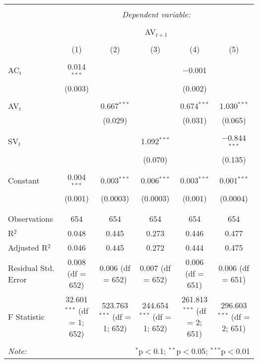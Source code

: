 
\begin{table}[!htbp] \centering 
  \caption{} 
  \label{} 
\begin{tabular}{@{\extracolsep{5pt}}lccccc} 
\\[-1.8ex]\hline 
\hline \\[-1.8ex] 
 & \multicolumn{5}{c}{\textit{Dependent variable:}} \\ 
\cline{2-6} 
\\[-1.8ex] & \multicolumn{5}{c}{AV$_{t+1}$} \\ 
\\[-1.8ex] & (1) & (2) & (3) & (4) & (5)\\ 
\hline \\[-1.8ex] 
 AC$_{t}$ & 0.014$^{***}$ &  &  & $-$0.001 &  \\ 
  & (0.003) &  &  & (0.002) &  \\ 
  & & & & & \\ 
 AV$_{t}$ &  & 0.667$^{***}$ &  & 0.674$^{***}$ & 1.030$^{***}$ \\ 
  &  & (0.029) &  & (0.031) & (0.065) \\ 
  & & & & & \\ 
 SV$_{t}$ &  &  & 1.092$^{***}$ &  & $-$0.844$^{***}$ \\ 
  &  &  & (0.070) &  & (0.135) \\ 
  & & & & & \\ 
 Constant & 0.004$^{***}$ & 0.003$^{***}$ & 0.006$^{***}$ & 0.003$^{***}$ & 0.001$^{***}$ \\ 
  & (0.001) & (0.0003) & (0.0003) & (0.001) & (0.0004) \\ 
  & & & & & \\ 
\hline \\[-1.8ex] 
Observations & 654 & 654 & 654 & 654 & 654 \\ 
R$^{2}$ & 0.048 & 0.445 & 0.273 & 0.446 & 0.477 \\ 
Adjusted R$^{2}$ & 0.046 & 0.445 & 0.272 & 0.444 & 0.475 \\ 
Residual Std. Error & 0.008 (df = 652) & 0.006 (df = 652) & 0.007 (df = 652) & 0.006 (df = 651) & 0.006 (df = 651) \\ 
F Statistic & 32.601$^{***}$ (df = 1; 652) & 523.763$^{***}$ (df = 1; 652) & 244.654$^{***}$ (df = 1; 652) & 261.813$^{***}$ (df = 2; 651) & 296.603$^{***}$ (df = 2; 651) \\ 
\hline 
\hline \\[-1.8ex] 
\textit{Note:}  & \multicolumn{5}{r}{$^{*}$p$<$0.1; $^{**}$p$<$0.05; $^{***}$p$<$0.01} \\ 
\end{tabular} 
\end{table} 

